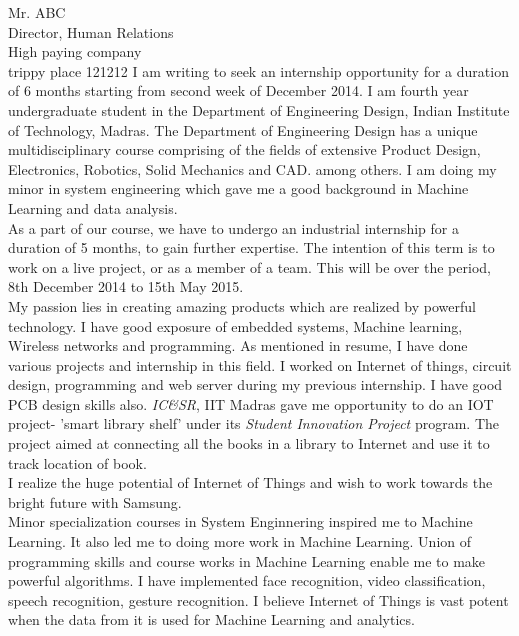 \documentclass[a4paper, 11pt]{letter}
\newcommand{\pgbr}{\vspace{4pt} \\}
\newcommand{\company}{Samsung}
\begin{document}
\begin{letter}{
Mr. ABC \\
Director, Human Relations \\
High paying company\\
trippy place 121212}
I am writing to seek an internship opportunity for a duration of 6 months starting from second week of December 2014. I am fourth year undergraduate student in the Department of Engineering Design, Indian Institute of Technology, Madras. The Department of Engineering Design has a unique multidisciplinary course comprising of the fields of extensive Product Design, Electronics, Robotics, Solid Mechanics and CAD. among others. I am doing my minor in system engineering which gave me a good background in Machine Learning and data analysis.\pgbr
As a part of our course, we have to undergo an industrial internship for a duration of 5 months, to gain further expertise. The intention of this term is to work on a live project, or as a member of a team. This will be over the period, 8th December 2014 to 15th May 2015.\pgbr
My passion lies in creating amazing products which are realized by powerful technology. I have good exposure of embedded systems, Machine learning, Wireless networks and programming. As mentioned in resume, I have done various projects and internship in this field. I worked on Internet of things, circuit design, programming and web server during my previous internship. I have good PCB design skills also. \textit{IC\&SR}, IIT Madras gave me opportunity to do an IOT project- 'smart library shelf' under its \textit{Student Innovation Project} program. The project aimed at connecting all the books in a library to Internet and use it to track location of book.\\ I realize the huge potential of  Internet of Things and wish to work towards the bright future with \company.\pgbr
Minor specialization courses in System Enginnering inspired me to Machine Learning. It also led me to doing more work in Machine Learning. Union of programming skills and course works in Machine Learning enable me to make powerful algorithms. I have implemented face recognition, video classification, speech recognition, gesture recognition. I believe Internet of Things is vast potent when the data from it is used for Machine Learning and analytics.\pgbr

\end{letter}
\end{document}
